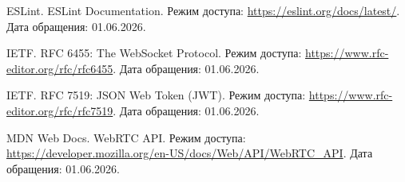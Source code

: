\begin{enumerate}[label={[\arabic*]},leftmargin=1.25cm,itemsep=0pt,topsep=0pt]
\item ESLint. ESLint Documentation. Режим доступа: \url{https://eslint.org/docs/latest/}. Дата обращения: 01.06.2026.
\item IETF. RFC 6455: The WebSocket Protocol. Режим доступа: \url{https://www.rfc-editor.org/rfc/rfc6455}. Дата обращения: 01.06.2026.
\item IETF. RFC 7519: JSON Web Token (JWT). Режим доступа: \url{https://www.rfc-editor.org/rfc/rfc7519}. Дата обращения: 01.06.2026.
\item MDN Web Docs. WebRTC API. Режим доступа: \url{https://developer.mozilla.org/en-US/docs/Web/API/WebRTC_API}. Дата обращения: 01.06.2026.
\end{enumerate}
